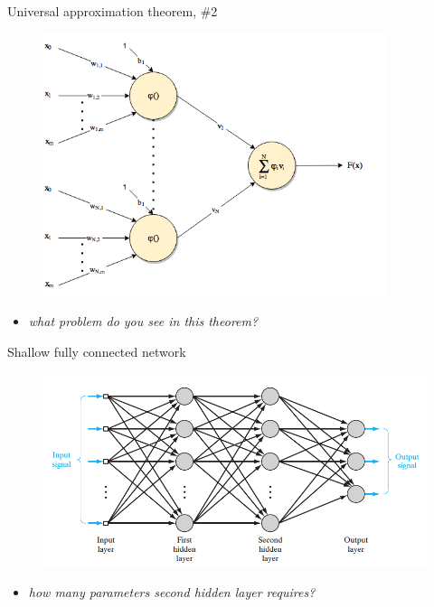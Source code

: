 \documentclass{beamer}
\begin{document}
\begin{frame}{Universal approximation theorem, \#2}

\begin{figure}[h!]
  \centering
  \includegraphics[width=0.9\textwidth]{images/uat.png}
\end{figure}	

\begin{itemize}
\item \textit{what problem do you see in this theorem?}
\end{itemize}

\end{frame}


\begin{frame}{Shallow fully connected network}

\begin{figure}[h!]
  \centering
  \includegraphics[width=1\textwidth]{images/mlp.png}
\end{figure}
 
\begin{itemize}
\item \textit{how many parameters second hidden layer requires?}
\end{itemize}

\end{frame}
\end{document}
